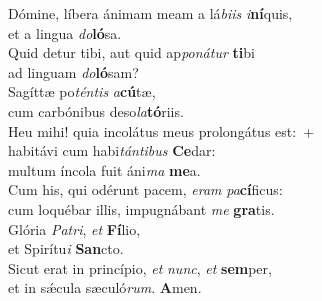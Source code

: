 \evenverse Dómine, líbera ánimam meam a lá\textit{bi}\textit{is} \textit{i}\textbf{ní}quis,~\*\\
\evenverse et a lingua \textit{do}\textbf{ló}sa.\\
\oddverse Quid detur tibi, aut quid ap\textit{po}\textit{ná}\textit{tur} \textbf{ti}bi~\*\\
\oddverse ad linguam \textit{do}\textbf{ló}sam?\\
\evenverse Sagíttæ po\textit{tén}\textit{tis} \textit{a}\textbf{cú}tæ,~\*\\
\evenverse cum carbónibus deso\textit{la}\textbf{tó}riis.\\
\oddverse Heu mihi! quia incolátus meus prolongátus est:~+\\
\oddverse  habitávi cum habi\textit{tán}\textit{ti}\textit{bus} \textbf{Ce}dar:~\*\\
\oddverse multum íncola fuit áni\textit{ma} \textbf{me}a.\\
\evenverse Cum his, qui odérunt pacem, \textit{e}\textit{ram} \textit{pa}\textbf{cí}ficus:~\*\\
\evenverse cum loquébar illis, impugnábant \textit{me} \textbf{gra}tis.\\
\oddverse Glória \textit{Pa}\textit{tri}, \textit{et} \textbf{Fí}lio,~\*\\
\oddverse et Spirítu\textit{i} \textbf{San}cto.\\
\evenverse Sicut erat in princípio, \textit{et} \textit{nunc}, \textit{et} \textbf{sem}per,~\*\\
\evenverse et in sǽcula sæculó\textit{rum}. \textbf{A}men.\\
